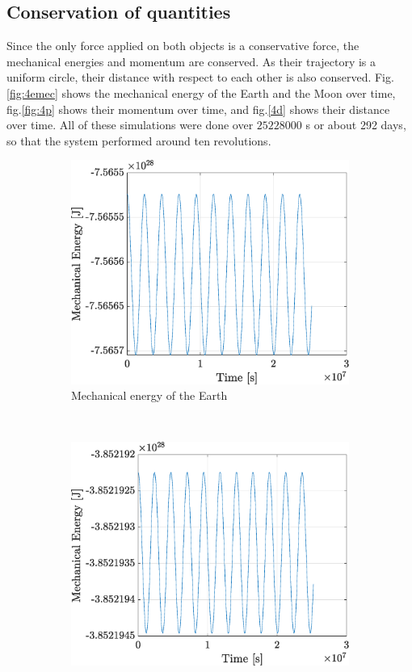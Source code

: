 \documentclass[a4paper,12pt,twoside]{article}
\begin{document}
\subsection{Conservation of quantities}
Since the only force applied on both objects is a conservative force, the mechanical energies and momentum are conserved. As their trajectory is a uniform circle, their distance with respect to each other is also conserved. Fig.\ref{fig:4emec} shows the mechanical energy of the Earth and the Moon over time, fig.\ref{fig:4p} shows their momentum over time, and fig.\ref{4d} shows their distance over time. All of these simulations were done over $25228000$ s or about 292 days, so that the system performed around ten revolutions.

\begin{figure}[h]
  \centering
  \begin{subfigure}[t]{0.48\textwidth}
    \includegraphics[width=\textwidth]{graphs/ex4b_emece.eps}
    \caption{Mechanical energy of the Earth}
    \label{fig:emece}
  \end{subfigure}
  ~
  \begin{subfigure}[t]{0.48\textwidth}
    \includegraphics[width=\textwidth]{graphs/ex4b_emecl.eps}

\end{subfigure}
\end{figure}
\end{document}
